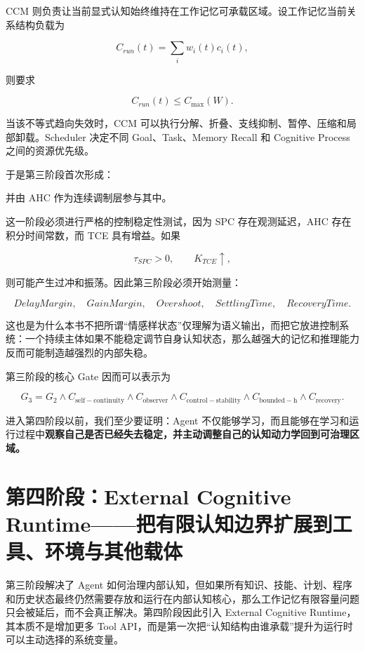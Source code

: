 CCM 则负责让当前显式认知始终维持在工作记忆可承载区域。设工作记忆当前关系结构负载为

\[
C_{run}(t)
=
\sum_i w_i(t)c_i(t),
\]

则要求

\[
C_{run}(t)
\leq
C_{\max}(W).
\]

当该不等式趋向失效时，CCM 可以执行分解、折叠、支线抑制、暂停、压缩和局部卸载。Scheduler 决定不同 Goal、Task、Memory Recall 和 Cognitive Process 之间的资源优先级。

于是第三阶段首次形成：

\begin{statementbox}
\centering
{}
\end{statementbox}

并由 AHC 作为连续调制层参与其中。

这一阶段必须进行严格的控制稳定性测试，因为 SPC 存在观测延迟，AHC 存在积分时间常数，而 TCE 具有增益。如果

\[
\tau_{SPC}>0,
\qquad
K_{TCE}\uparrow,
\]

则可能产生过冲和振荡。因此第三阶段必须开始测量：

\[
DelayMargin,\quad
GainMargin,\quad
Overshoot,\quad
SettlingTime,\quad
RecoveryTime.
\]

这也是为什么本书不把所谓“情感样状态”仅理解为语义输出，而把它放进控制系统：一个持续主体如果不能稳定调节自身认知状态，那么越强大的记忆和推理能力反而可能制造越强烈的内部失稳。

第三阶段的核心 Gate 因而可以表示为

\[
G_3
=
G_2
\land
C_{\mathrm{self-continuity}}
\land
C_{\mathrm{observer}}
\land
C_{\mathrm{control-stability}}
\land
C_{\mathrm{bounded-h}}
\land
C_{\mathrm{recovery}}.
\]

进入第四阶段以前，我们至少要证明：Agent 不仅能够学习，而且能够在学习和运行过程中\textbf{观察自己是否已经失去稳定，并主动调整自己的认知动力学回到可治理区域。}

\section{第四阶段：External Cognitive Runtime——把有限认知边界扩展到工具、环境与其他载体}

第三阶段解决了 Agent 如何治理内部认知，但如果所有知识、技能、计划、程序和历史状态最终仍然需要存放和运行在内部认知核心，那么工作记忆有限容量问题只会被延后，而不会真正解决。第四阶段因此引入 External Cognitive Runtime，其本质不是增加更多 Tool API，而是第一次把“认知结构由谁承载”提升为运行时可以主动选择的系统变量。

